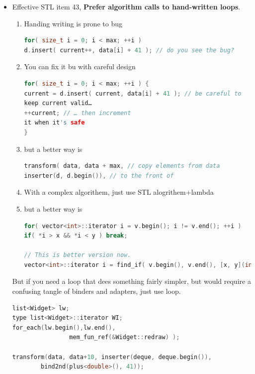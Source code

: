 \documentclass[a4paper,12pt,twoside]{book}
\begin{document}
\begin{itemize}

\item Effective STL item 43, \textbf{Prefer algorithm calls to hand-written loops}.
\begin{enumerate}
\item  Handing writing is prone to bug

\begin{lstlisting}[frame=single, language=c++]
for( size_t i = 0; i < max; ++i )
d.insert( current++, data[i] + 41 ); // do you see the bug?
\end{lstlisting}
\item You can fix it bu with careful design
\begin{lstlisting}[frame=single, language=c++]
for( size_t i = 0; i < max; ++i ) {
current = d.insert( current, data[i] + 41 ); // be careful to
keep current valid…
++current; // … then increment
it when it's safe
}
\end{lstlisting}
\item but a better way is
\begin{lstlisting}[frame=single, language=c++]
transform( data, data + max, // copy elements from data
inserter(d, d.begin()), // to the front of
\end{lstlisting}

\item With a complex algorithem, just use STL alogrithem+lambda
\item but a better way is
\begin{lstlisting}[frame=single, language=c++]
for( vector<int>::iterator i = v.begin(); i != v.end(); ++i )
if( *i > x && *i < y ) break;

// This is better version now.
vector<int>::iterator i = find_if( v.begin(), v.end(), [x, y](int &i){i>x && i<y} );
\end{lstlisting}



\end{enumerate}
But if you need a loop that dees something fairly simpler, but would require a confusing tangle of binders and adapters, just use loop.
\begin{lstlisting}[frame=single, language=c++]
list<Widget> lw;
type list<Widget>::iterator WI;
for_each(lw.begin(),lw.end(),
                mem_fun_ref(&Widget::redraw) );

transform(data, data+10, inserter(deque, deque.begin()),
        bind2nd(plus<double>(), 41));
\end{lstlisting}


\end{itemize}
\end{document}
